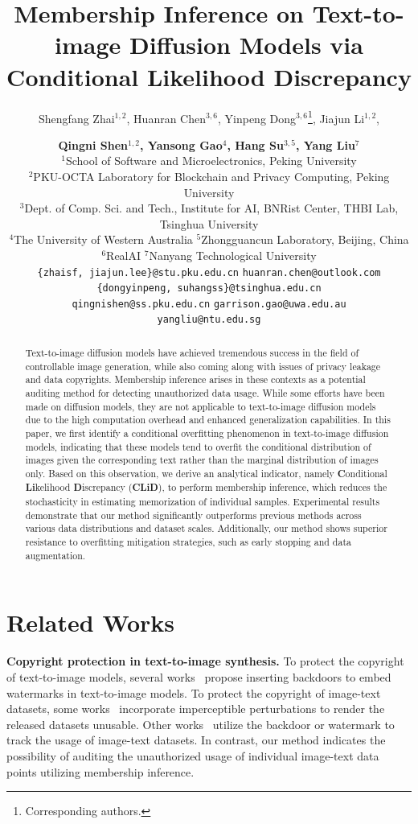 \documentclass{article}
\title{
Membership Inference on Text-to-image Diffusion Models via Conditional Likelihood Discrepancy
}
\author{
Shengfang Zhai$^{1,2}$,
Huanran Chen$^{3,6}$, 
Yinpeng Dong$^{3,6}$\thanks{Corresponding authors.}\;, 
Jiajun Li$^{1,2}$,
\and
\textbf{
Qingni Shen$^{1,2}$\footnotemark[1]\;, 
Yansong Gao$^{4}$,
Hang Su$^{3,5}$, Yang Liu$^{7}$} \\
$^{1}$School of Software and Microelectronics, Peking University 
\\ %
$^{2}$PKU-OCTA Laboratory for Blockchain and Privacy Computing, Peking University \\
$^{3}$Dept. of Comp. Sci. and Tech., Institute for AI, BNRist Center, THBI Lab, Tsinghua University\\
$^{4}$The University of Western Australia \quad $^5$Zhongguancun Laboratory, Beijing, China \\
$^{6}$RealAI \quad 
$^{7}$Nanyang Technological University \\
\texttt{\{zhaisf,  jiajun.lee\}@stu.pku.edu.cn} \quad  
\texttt{huanran.chen@outlook.com} \\  
\texttt{\{dongyinpeng, suhangss\}@tsinghua.edu.cn} \\
\texttt{qingnishen@ss.pku.edu.cn} \quad
\texttt{garrison.gao@uwa.edu.au} \\  
\texttt{yangliu@ntu.edu.sg} 
}
\theoremstyle{plain}
\theoremstyle{remark}
\begin{document}
\maketitle


\begin{abstract}
Text-to-image diffusion models have achieved tremendous success in the field of controllable image generation, while also coming along with issues of privacy leakage and data copyrights. Membership inference arises in these contexts as a potential auditing method for detecting unauthorized data usage. While some efforts have been made on diffusion models, they are not applicable to text-to-image diffusion models due to the high computation overhead and enhanced generalization capabilities. In this paper, we first identify a conditional overfitting phenomenon in text-to-image diffusion models, indicating that these models tend to overfit the conditional distribution of images given the corresponding text rather than the marginal distribution of images only. 
Based on this observation, we derive an analytical indicator, namely \textbf{C}onditional \textbf{Li}kelihood \textbf{D}iscrepancy (\textbf{CLiD}), to perform membership inference, which reduces the stochasticity in estimating memorization of individual samples.
Experimental results demonstrate that our method significantly outperforms previous methods across various data distributions and dataset scales. Additionally, our method shows superior resistance to overfitting mitigation strategies, such as early stopping and data augmentation.
\end{abstract}










\section{Related Works}
\vspace{-3pt}

\textbf{Copyright protection in text-to-image synthesis.} 
To protect the copyright of text-to-image models, several works~\cite{zhao2023recipe,zhai2023text} propose inserting backdoors to embed watermarks in text-to-image models.
To protect the copyright of image-text datasets, some works~\cite{salman2023raising, zhao2023unlearnable, shan2023glaze} incorporate imperceptible perturbations to render the released datasets unusable.
Other works~\cite{wang2023diagnosis, cui2023ft} utilize the backdoor or watermark to track the usage of image-text datasets.  
In contrast, our method indicates the possibility of auditing the unauthorized usage of individual image-text data points utilizing membership inference.
\end{document}
